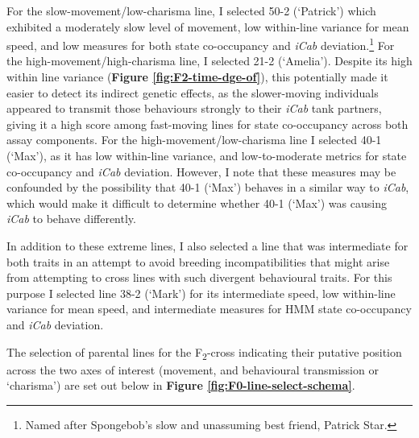 \documentclass[
]{book}
\begin{document}
For the slow-movement/low-charisma line, I selected \textcolor{50-2 (‘Patrick’)_BB81FF}{50-2 (‘Patrick’)} which exhibited a moderately slow level of movement, low within-line variance for mean speed, and low measures for both state co-occupancy and \emph{\textcolor{iCab_424B4D}{iCab}} deviation.\footnote{Named after Spongebob's slow and unassuming best friend, Patrick Star.} For the high-movement/high-charisma line, I selected \textcolor{21-2 (‘Amelia’)_49B500}{21-2 (‘Amelia’)}. Despite its high within line variance (\textbf{Figure \ref{fig:F2-time-dge-of}}), this potentially made it easier to detect its indirect genetic effects, as the slower-moving individuals appeared to transmit those behaviours strongly to their \emph{\textcolor{iCab_424B4D}{iCab}} tank partners, giving it a high score among fast-moving lines for state co-occupancy across both assay components. For the high-movement/low-charisma line I selected \textcolor{40-1 (‘Max’)_93AA00}{40-1 (‘Max’)}, as it has low within-line variance, and low-to-moderate metrics for state co-occupancy and \emph{\textcolor{iCab_424B4D}{iCab}} deviation. However, I note that these measures may be confounded by the possibility that \textcolor{40-1 (‘Max’)_93AA00}{40-1 (‘Max’)} behaves in a similar way to \emph{\textcolor{iCab_424B4D}{iCab}}, which would make it difficult to determine whether \textcolor{40-1 (‘Max’)_93AA00}{40-1 (‘Max’)} was causing \emph{\textcolor{iCab_424B4D}{iCab}} to behave differently.

In addition to these extreme lines, I also selected a line that was intermediate for both traits in an attempt to avoid breeding incompatibilities that might arise from attempting to cross lines with such divergent behavioural traits. For this purpose I selected line \textcolor{38-2 (‘Mark’)_00C08B}{38-2 (‘Mark’)} for its intermediate speed, low within-line variance for mean speed, and intermediate measures for HMM state co-occupancy and \emph{\textcolor{iCab_424B4D}{iCab}} deviation.

The selection of parental lines for the F\textsubscript{2}-cross indicating their putative position across the two axes of interest (movement, and behavioural transmission or `charisma') are set out below in \textbf{Figure \ref{fig:F0-line-select-schema}}.
\end{document}
